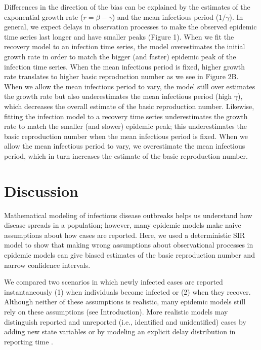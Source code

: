 \documentclass[12pt]{article}\usepackage[]{graphicx}\usepackage[]{color}
\begin{document}
Differences in the direction of the bias can be explained by the estimates of the
exponential growth rate ($r = \beta - \gamma$) and the mean infectious period ($1/\gamma$).
In general, we expect delays in observation processes to make the observed epidemic 
time series last longer and have smaller peaks (Figure 1).
When we fit the recovery model to an infection time series, the model overestimates
the initial growth rate in order to match the bigger (and faster) epidemic peak of the 
infection time series. When the mean infectious period is fixed, higher growth rate
translates to higher basic reproduction number as we see in Figure 2B. When we allow
the mean infectious period to vary, the model still over estimates the growth rate but
also underestimates the mean infectious period (high $\gamma$), 
which decreases the overall estimate of the basic reproduction number.
Likewise, fitting the infection model to a recovery time series underestimates
the growth rate to match the smaller (and slower) epidemic peak; this 
underestimates the basic reproduction number when the mean infectious period is fixed. 
When we allow the mean infectious period to vary, we overestimate the mean infectious
period, which in turn increases the estimate of the basic reproduction number.

\section{Discussion}

Mathematical modeling of infectious disease outbreaks helps us understand 
how disease spreads in a population; however, many epidemic models make 
naive assumptions about how cases are reported. 
Here, we used a deterministic SIR model to show that 
making wrong assumptions about observational processes in epidemic models
can give biased estimates of the basic reproduction number and narrow
confidence intervals.

We compared two scenarios in which newly infected cases are reported 
instantaneously (1) when individuals become infected or
(2) when they recover. Although neither of these
assumptions is realistic, many epidemic models still rely on these
assumptions (see Introduction). 
More realistic models may distinguish reported and unreported
(i.e., identified and unidentified) cases by adding
new state variables \citep{browne2015modeling,webb2015model} 
or by modeling an explicit delay distribution in reporting time 
\citep{harris1990reporting, ferguson2001foot, goldstein2009reconstructing,
ster2009epidemiological, birrell2011bayesian, funk2018real}.
\end{document}
